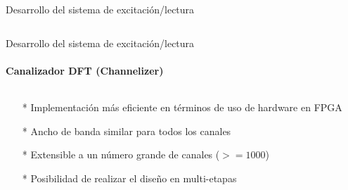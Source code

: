 \documentclass[ignorenonframetext,12pt]{beamer}
\begin{document}
\begin{frame}{Desarrollo del sistema de excitación/lectura}
\begin{columns}
\begin{column}{0.5\textwidth}
\begin{center}
												\end{center}
								\end{column}
				\end{columns}

\end{frame}


\begin{frame}{Desarrollo del sistema de excitación/lectura}
\framesubtitle{Canalizador DFT (Channelizer)}
				\begin{columns}
								\begin{column}{0.5\textwidth}
												\begin{itemize}
																\item[*] Implementación m\'as eficiente en t\'erminos de uso de hardware en FPGA
																\item[*] Ancho de banda similar para todos los canales 
																\item[*] Extensible a un n\'umero grande de canales ($>=1000$)
																\item[*] Posibilidad de realizar el diseño en multi-etapas
												\end{itemize}
								\end{column}
								\begin{column}{0.5\textwidth}


\end{column}
\end{columns}
\end{frame}
\end{document}
